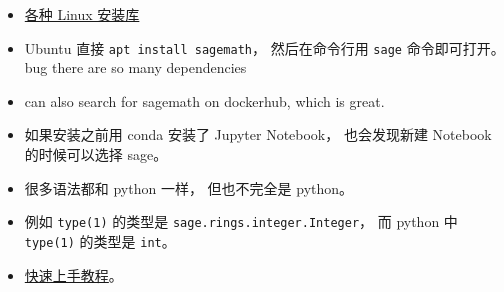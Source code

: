 
\begin{issues}
\issueDraft
\end{issues}

\begin{itemize}
\item \href{https://repology.org/project/sagemath/versions}{各种 Linux 安装库}
\item Ubuntu 直接 \verb|apt install sagemath|， 然后在命令行用 \verb|sage| 命令即可打开。 bug there are so many dependencies
\item can also search for sagemath on dockerhub, which is great.
\item 如果安装之前用 conda 安装了 Jupyter Notebook， 也会发现新建 Notebook 的时候可以选择 sage。
\item 很多语法都和 python 一样， 但也不完全是 python。
\item 例如 \verb|type(1)| 的类型是 \verb|sage.rings.integer.Integer|， 而 python 中 \verb|type(1)| 的类型是 \verb|int|。
\item \href{https://www.sagemath.org/tour-quickstart.html}{快速上手教程}。
\end{itemize}
